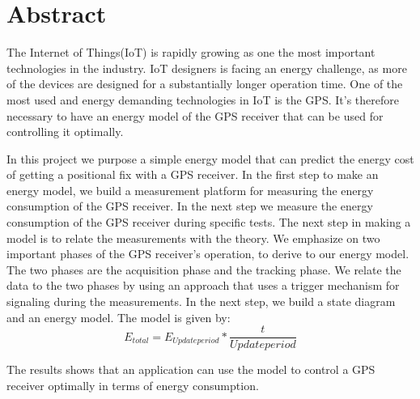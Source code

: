 \chapter*{Abstract}

The Internet of Things(IoT) is rapidly growing as one the most important technologies in the industry. IoT designers is facing an energy challenge,  as more of the devices are designed for a substantially longer operation time. One of the most used and energy demanding technologies in IoT is the GPS. It's therefore necessary to have an energy model of the GPS receiver that can be used for controlling it optimally.

In this project we purpose a simple energy model that can predict the energy cost of getting a positional fix with a GPS receiver. In the first step to make an energy model, we build a measurement platform for measuring the energy consumption of the GPS receiver. In the next step we measure the energy consumption of the GPS receiver during specific tests. The next step in making a model is to relate the measurements with the theory. We emphasize on two important phases of the GPS receiver's operation, to derive to our energy model.  The two phases are the acquisition phase and the tracking phase. We relate the data to the two phases by using an approach that uses a trigger mechanism for signaling during the measurements. In the next step, we build a state diagram and an energy model. The model is given by:
\begin{equation}
E_{total} = E_{Updateperiod}* \frac{t}{Updateperiod}
\end{equation}

The results shows that an application can use the model to control a GPS receiver optimally in terms of energy consumption. 


\newpage